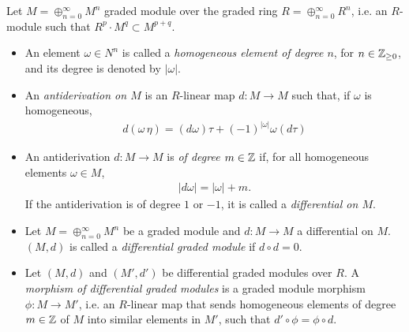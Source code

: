 \lin

\begin{definition}\label{defnDiffGModule}
    Let $M = \oplus_{n = 0}^\infty M^n$ graded module over the graded ring $R = \oplus_{n = 0}^\infty R^n$, i.e. an $R$-module such that $R^p \cdot M^q \subset M^{p+q}$.
    
    \begin{itemize}
    
    \item An element $\omega \in N^n$ is called a \emph{homogeneous element of degree $n$}, for $n \in \mathbb{Z}_{\geq 0}$, and its degree is denoted by $|\omega|$.
    
    \item An \emph{antiderivation on $M$} is an $R$-linear map $d: M \to M$ such that, if $\omega$ is homogeneous, 
    \begin{align*}
        d(\omega \, \eta) = (d\omega)\tau + (-1)^{|\omega|} \omega (d\tau)
    \end{align*}
    
    \item An antiderivation $d: M \to M$ is \emph{of degree $m \in \mathbb{Z}$} if, for all homogeneous elements $\omega \in M$,
    \begin{align*}
        |d\omega| = |\omega| + m.
    \end{align*}
    If the antiderivation is of degree $1$ or $-1$, it is called a \emph{differential on $M$}.
    
    \item Let $M = \oplus_{n = 0}^\infty M^n$ be a graded module and $d: M \to M$ a differential on $M$. $(M, d)$ is called a \emph{differential graded module} if $d \circ d = 0$.
    
    \item Let $(M, d)$ and $(M', d')$ be differential graded modules over $R$. A \emph{morphism of differential graded modules} is a graded module morphism $\phi: M \to M'$, i.e. an $R$-linear map that sends homogeneous elements of degree $m \in \mathbb{Z}$ of $M$ into similar elements in $M'$, such that $d' \circ \phi = \phi \circ d$.
    
    \end{itemize}
    
\end{definition}

